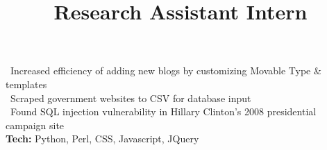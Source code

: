         \title{Research Assistant Intern}
        \begin{position}
            \textbullet \ Increased efficiency of adding new blogs by customizing Movable Type \& templates \\
            \textbullet \ Scraped government websites to CSV for database input \\
			\textbullet \ Found SQL injection vulnerability in Hillary Clinton's 2008 presidential campaign site\\
			\textbf{Tech:} Python, Perl, CSS, Javascript, JQuery
        \end{position}
